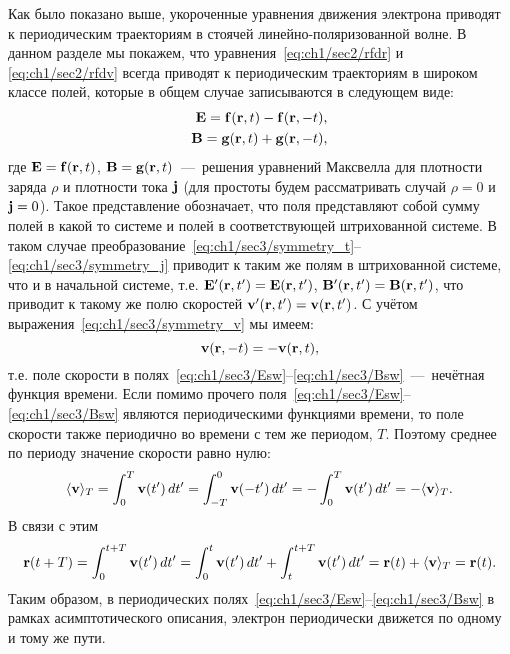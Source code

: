 Как было показано выше, укороченные уравнения движения электрона приводят к периодическим траекториям в стоячей линейно-поляризованной волне. В данном разделе мы покажем, что уравнения~\eqref{eq:ch1/sec2/rfdr} и \eqref{eq:ch1/sec2/rfdv} всегда приводят к периодическим траекториям в широком классе полей, которые в общем случае записываются в следующем виде:
\begin{eqnarray}
    \label{eq:ch1/sec3/Esw}
    \vb{E} = \vb{f}(\vb{r}, t) - \vb{f}(\vb{r}, -t), \\
    \label{eq:ch1/sec3/Bsw}
    \vb{B} = \vb{g}(\vb{r}, t) + \vb{g}(\vb{r}, -t),
\end{eqnarray}
где $\vb{E = f}(\vb{r}, t)$, $\vb{B = g}(\vb{r}, t)$~---~решения уравнений Максвелла для плотности заряда $\rho$ и плотности тока $\vb{j}$ (для простоты будем рассматривать случай $\rho = 0$ и $\vb{j} = 0$). 
Такое представление обозначает, что поля представляют собой сумму полей в какой то системе и полей в соответствующей штрихованной системе. В таком случае преобразование~\eqref{eq:ch1/sec3/symmetry_t}--\eqref{eq:ch1/sec3/symmetry_j} приводит к таким же полям в штрихованной системе, что и в начальной системе, т.е. $\vb{E}'(\vb{r}, t') = \vb{E}(\vb{r}, t')$, $\vb{B}'(\vb{r}, t')
= \vb{B}(\vb{r}, t')$, что приводит к такому же полю скоростей $\vb{v}'(\vb{r}, t') = \vb{v}(\vb{r}, t')$. С учётом выражения~\eqref{eq:ch1/sec3/symmetry_v} мы имеем:
\begin{equation}
    \vb{v}(\vb{r}, -t) = -\vb{v}(\vb{r}, t),
\end{equation}
т.е. поле скорости в полях~\eqref{eq:ch1/sec3/Esw}--\eqref{eq:ch1/sec3/Bsw}~---~нечётная функция времени. Если помимо прочего поля~\eqref{eq:ch1/sec3/Esw}--\eqref{eq:ch1/sec3/Bsw} являются периодическими функциями времени, то поле скорости также периодично во времени с тем же периодом, $T$. Поэтому среднее по периоду значение скорости равно нулю:
\begin{equation}
    \langle\vb{v}\rangle_T=\int_0^{T} \vb{v}(t')\,dt'=\int_{-T}^{0}\vb{v}(-t')\,dt'=-\int_{0}^{T}\vb{v}(t')\,dt'=-\langle\vb{v}\rangle_T.
\end{equation}
В связи с этим
\begin{equation}
    \vb{r}(t+T)=\int_0^{t+T} \vb{v}(t')\,dt'=\int_0^t \vb{v}(t')\,dt'+\int_t^{t+T} \vb{v}(t')\,dt'=\vb{r}(t)+\langle\vb{v}\rangle_T=\vb{r}(t).
\end{equation}
Таким образом, в периодических полях~\eqref{eq:ch1/sec3/Esw}--\eqref{eq:ch1/sec3/Bsw} в рамках асимптотического описания, электрон периодически движется по одному и тому же пути.

